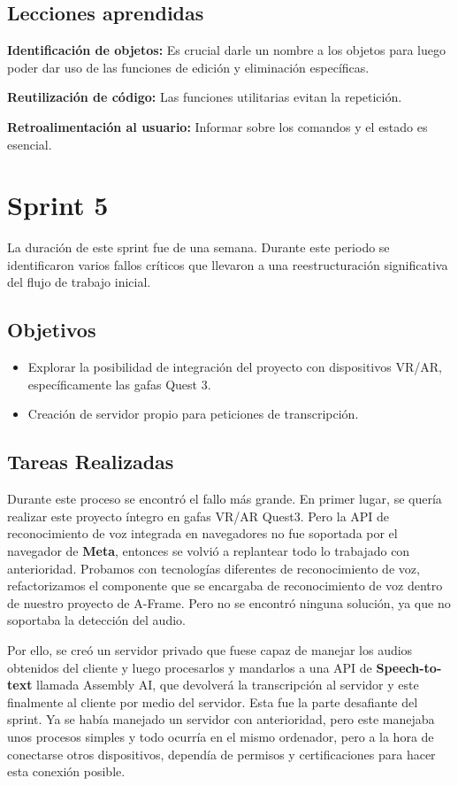 \documentclass[a4paper, 12pt]{book}
\begin{document}
\subsection{Lecciones aprendidas}

\textbf{Identificación de objetos:} Es crucial darle un nombre a los objetos para luego poder dar uso de las funciones de edición y eliminación específicas.

\textbf{Reutilización de código:} Las funciones utilitarias evitan la repetición.

\textbf{Retroalimentación al usuario:} Informar sobre los comandos y el estado es esencial.

\section{Sprint 5} 
\label{sec:sprint5}
La duración de este sprint fue de una semana. Durante este periodo se identificaron varios fallos críticos que llevaron a una reestructuración significativa del flujo de trabajo inicial.
\subsection{Objetivos}
\begin{itemize}
 
 \item Explorar la posibilidad de integración del proyecto con dispositivos VR/AR, específicamente las gafas Quest 3.
 \item Creación de servidor propio para peticiones de transcripción.
 
\end{itemize}
\subsection{Tareas Realizadas}

Durante este proceso se encontró el fallo más grande. En primer lugar, se quería realizar este proyecto íntegro en gafas VR/AR Quest3. 
Pero la API de reconocimiento de voz integrada en navegadores no fue soportada por el navegador de \textbf{Meta}, entonces se volvió a replantear todo lo trabajado con anterioridad.
Probamos con tecnologías diferentes de reconocimiento de voz, refactorizamos el componente que se encargaba de reconocimiento de voz dentro de nuestro proyecto de A-Frame.
Pero no se encontró ninguna solución, ya que no soportaba la detección del audio.

Por ello, se creó un servidor privado que fuese capaz de manejar los audios obtenidos del cliente y luego procesarlos y mandarlos a una API de \textbf{Speech-to-text} llamada Assembly AI, que devolverá la transcripción al servidor y este finalmente al cliente por medio del servidor.
Esta fue la parte desafiante del sprint. Ya se había manejado un servidor con anterioridad, pero este manejaba unos procesos simples y todo ocurría en el mismo ordenador, pero a la hora de conectarse otros dispositivos, dependía de permisos y certificaciones para hacer esta conexión posible.
\end{document}
